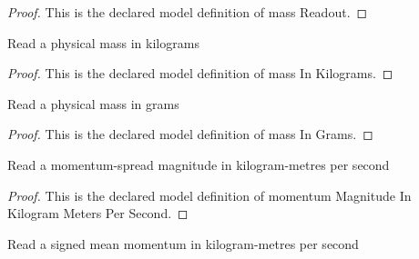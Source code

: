 \begin{proof}
  This is the declared model definition of mass Readout.
\end{proof}
\begin{definition}
  \label{def:physics:phyx-mini-0654:phyxminiproblems-problemphyxmini0654-massinkilograms}
  Read a physical mass in kilograms
\end{definition}
\begin{proof}
  This is the declared model definition of mass In Kilograms.
\end{proof}
\begin{definition}
  \label{def:physics:phyx-mini-0654:phyxminiproblems-problemphyxmini0654-massingrams}
  Read a physical mass in grams
\end{definition}
\begin{proof}
  This is the declared model definition of mass In Grams.
\end{proof}
\begin{definition}
  \label{def:physics:phyx-mini-0654:phyxminiproblems-problemphyxmini0654-momentummagnitudeinkilogrammeterspersecond}
  Read a momentum-spread magnitude in kilogram-metres per second
\end{definition}
\begin{proof}
  This is the declared model definition of momentum Magnitude In Kilogram Meters Per Second.
\end{proof}
\begin{definition}
  \label{def:physics:phyx-mini-0654:phyxminiproblems-problemphyxmini0654-signedmomentuminkilogrammeterspersecond}
  Read a signed mean momentum in kilogram-metres per second
\end{definition}
